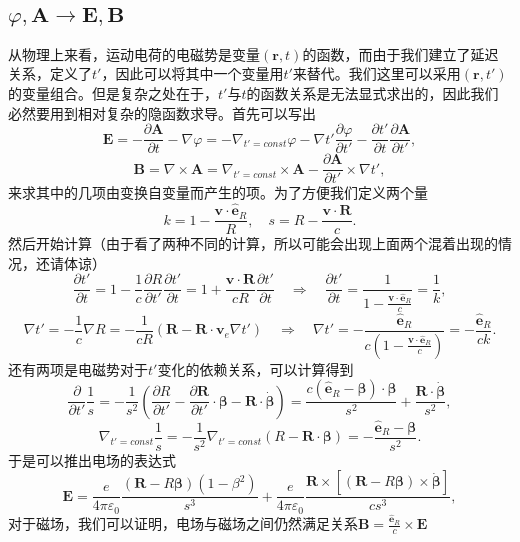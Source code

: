 \documentclass[UTF8]{ctexbook}
\renewcommand{\b}{\boldsymbol}
\numberwithin{equation}{chapter}
\begin{document}
	\subsection{$\varphi,\b{A}\rightarrow \b{E},\b{B}$}
	从物理上来看，运动电荷的电磁势是变量$(\b{r},t)$的函数，而由于我们建立了延迟关系，定义了$t'$，因此可以将其中一个变量用$t'$来替代。我们这里可以采用$(\b{r},t')$的变量组合。但是复杂之处在于，$t'$与$t$的函数关系是无法显式求出的，因此我们必然要用到相对复杂的隐函数求导。首先可以写出
	\[
		\b{E}=-\frac{\partial\b{A}}{\partial t}-\nabla\varphi=-\nabla_{t'=const}\varphi-\nabla t'\frac{\partial \varphi}{\partial t'}-\frac{\partial t'}{\partial t}\frac{\partial \b{A}}{\partial t'},
	\]
	\[
		\b{B}=\nabla\times\b{A}=\nabla_{t'=const}\times\b{A}-\frac{\partial \b{A}}{\partial t'}\times\nabla t',
	\]
	来求其中的几项由变换自变量而产生的项。为了方便我们定义两个量
	\[k=1-\frac{\b{v}\cdot\hat{\b{e}}_R}{R},\quad s=R-\frac{\b{v}\cdot\b{R}}{c}.\]
	然后开始计算（由于看了两种不同的计算，所以可能会出现上面两个混着出现的情况，还请体谅）
	\[\frac{\partial t'}{\partial t}=1-\frac{1}{c}\frac{\partial R}{\partial t'}\frac{\partial t'}{\partial t}=1+\frac{\b{v}\cdot\b{R}}{cR}\frac{\partial t'}{\partial t}\quad \Rightarrow \quad \frac{\partial t'}{\partial t}=\frac{1}{1-\frac{\b{v}\cdot\hat{\b{e}}_R}{c}}=\frac{1}{k},\]
	\[\nabla t'=-\frac{1}{c}\nabla R=-\frac{1}{cR}\left(\b{R}-\b{R}\cdot\b{v}_e\nabla t'\right) \quad \Rightarrow \quad \nabla t'=-\frac{\hat{\b{e}}_R}{c\left(1-\frac{\b{v}\cdot\hat{\b{e}}_R}{c}\right)}=-\frac{\hat{\b{e}}_R}{ck}.\]
	还有两项是电磁势对于$t'$变化的依赖关系，可以计算得到
	\[\frac{\partial }{\partial t'}\frac{1}{s}=-\frac{1}{s^2}\left(\frac{\partial R}{\partial t'}-\frac{\partial \b{R}}{\partial t'}\cdot\b{\beta}-\b{R}\cdot\dot{\b{\beta}}\right)=\frac{c(\hat{\b{e}}_R-\b{\beta})\cdot\b{\beta}}{s^2}+\frac{\b{R}\cdot\dot{\b{\beta}}}{s^2},\]
	\[\nabla_{t'=const}\frac{1}{s}=-\frac{1}{s^2}\nabla_{t'=const}(R-\b{R}\cdot\b{\beta})=-\frac{\hat{\b{e}}_R-\b{\beta}}{s^2}.\]
	于是可以推出电场的表达式
	\[\b{E}=\frac{e}{4\pi\varepsilon_0}\frac{(\b{R}-R\b{\beta})(1-\beta^2)}{s^3}+\frac{e}{4\pi\varepsilon_0}\frac{\b{R}\times \left[(\b{R}-R\b{\beta})\times\dot{\b{\beta}}\right]}{cs^3},\]
	对于磁场，我们可以证明，电场与磁场之间仍然满足关系$\b{B}=\frac{\hat{\b{e}}_R}{c}\times\b{E}$
\end{document}
